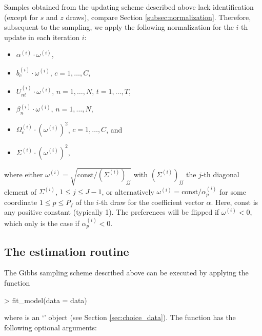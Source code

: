 \documentclass[article]{jss}
\newcommand{\class}[1]{`\code{#1}'}
\begin{document}
Samples obtained from the updating scheme described above lack identification (except for $s$ and $z$ draws), compare Section \ref{subsec:normalization}. Therefore, subsequent to the sampling, we apply the following normalization for the $i$-th update in each iteration $i$:
\begin{itemize}
  \item $\alpha^{(i)} \cdot \omega^{(i)}$,
  \item $b_c^{(i)} \cdot \omega^{(i)}$, $c=1,\dots,C$,
  \item $U_{nt}^{(i)} \cdot \omega^{(i)}$, $n = 1,\dots,N$, $t = 1,\dots,T$,
  \item $\beta_n^{(i)} \cdot \omega^{(i)}$, $n = 1,\dots,N$,
  \item $\Omega_c^{(i)} \cdot (\omega^{(i)})^2$, $c=1,\dots,C$, and
  \item $\Sigma^{(i)} \cdot (\omega^{(i)})^2$,
\end{itemize}
where either $\omega^{(i)} = \sqrt{\text{const} / (\Sigma^{(i)})_{jj}}$ with $(\Sigma^{(i)})_{jj}$ the $j$-th diagonal element of $\Sigma^{(i)}$, $1\leq j \leq J-1$, or alternatively $\omega^{(i)} = \text{const} / \alpha^{(i)}_p$ for some coordinate $1\leq p \leq P_f$ of the $i$-th draw for the coefficient vector $\alpha$. Here, $\text{const}$ is any positive constant (typically 1). The preferences will be flipped if $\omega^{(i)} < 0$, which only is the case if $\alpha^{(i)}_p < 0$.

\subsection{The estimation routine} \label{subsec:estimation_routine}

The Gibbs sampling scheme described above can be executed by applying the function

\begin{Schunk}
\begin{Sinput}
> fit_model(data = data)
\end{Sinput}
\end{Schunk}

where  is an \class{RprobitB\_data} object (see Section \ref{sec:choice_data}). The function has the following optional arguments:
\end{document}
